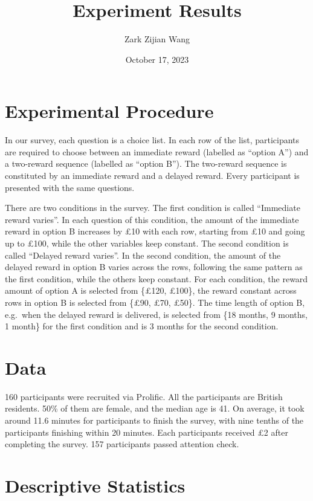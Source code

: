 \documentclass[
  12pt,
]{article}
\title{Experiment Results}
\author{Zark Zijian Wang}
\date{October 17, 2023}
\begin{document}
\maketitle

\hypertarget{experimental-procedure}{%
\section{Experimental Procedure}\label{experimental-procedure}}

In our survey, each question is a choice list. In each row of the list,
participants are required to choose between an immediate reward
(labelled as ``option A'') and a two-reward sequence (labelled as
``option B''). The two-reward sequence is constituted by an immediate
reward and a delayed reward. Every participant is presented with the
same questions.

There are two conditions in the survey. The first condition is called
``Immediate reward varies''. In each question of this condition, the
amount of the immediate reward in option B increases by £10 with each
row, starting from £10 and going up to £100, while the other variables
keep constant. The second condition is called ``Delayed reward varies''.
In the second condition, the amount of the delayed reward in option B
varies across the rows, following the same pattern as the first
condition, while the others keep constant. For each condition, the
reward amount of option A is selected from \{£120, £100\}, the reward
constant across rows in option B is selected from \{£90, £70, £50\}. The
time length of option B, e.g.~when the delayed reward is delivered, is
selected from \{18 months, 9 months, 1 month\} for the first condition
and is 3 months for the second condition.

\hypertarget{data}{%
\section{Data}\label{data}}

160 participants were recruited via Prolific. All the participants are
British residents. 50\% of them are female, and the median age is 41. On
average, it took around 11.6 minutes for participants to finish the
survey, with nine tenths of the participants finishing within 20
minutes. Each participants received £2 after completing the survey. 157
participants passed attention check.

\hypertarget{descriptive-statistics}{%
\section{Descriptive Statistics}\label{descriptive-statistics}}
\end{document}
